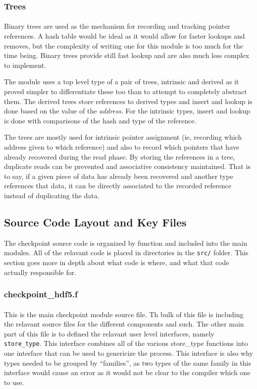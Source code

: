 \documentclass{article}
\begin{document}
\subsubsection{Trees}
\paragraph{}
Binary trees are used as the mechanism for recording and tracking pointer references. A hash table would be ideal as it would allow for faster lookups and removes, but the complexity of writing one for this module is too much for the time being. Binary trees provide still fast lookup and are also much less complex to implement.

The module uses a top level type of a pair of trees, intrinsic and derived as it proved simpler to differentiate these too than to attempt to completely abstract them. The derived trees store references to derived types and insert and lookup is done based on the value of the \emph{address}. For the intrinsic types, insert and lookup is done with comparisons of the hash and type of the reference.

The trees are mostly used for intrinsic pointer assignment (ie, recording which address given to which reference) and also to record which pointers that have already recovered during the read phase. By storing the references in a tree, duplicate reads can be prevented and associative consistency maintained. That is to say, if a given piece of data has already been recovered and another type references that data, it can be directly associated to the recorded reference instead of duplicating the data.

\subsection{Source Code Layout and Key Files}
The checkpoint source code is organized by function and included into the main modules. All of the relavant code is placed in directories in the \texttt{src/} folder. This section goes more in depth about what code is where, and what that code actually responsible for.

\subsubsection{checkpoint\_hdf5.f}
\paragraph{}
This is the main checkpoint module source file. Th bulk of this file is including the relavant source files for the different components and such. The other main part of this file is to defined the relavant user level interfaces, namely \texttt{store\_type}. This interface combines all of the various store\_type functions into one interface that can be used to genericize the process. This interface is also why types needed to be grouped by ``families'', as two types of the same family in this interface would cause an error as it would not be clear to the compiler which one to use.
\end{document}
